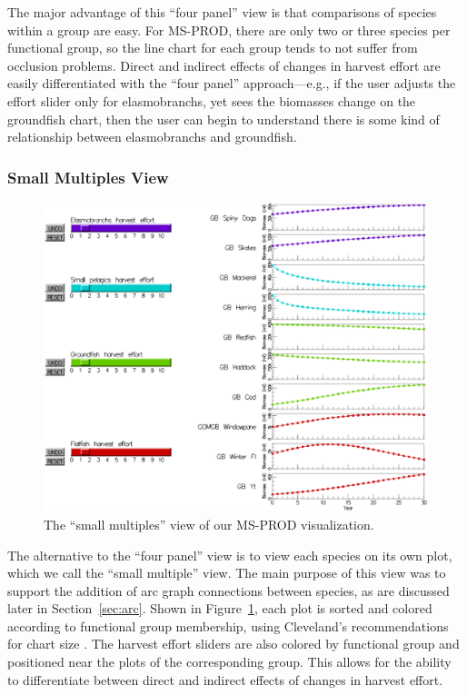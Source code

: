 The major advantage of this ``four panel'' view is that comparisons of species within a group are easy.  For MS-PROD, there are only two or three species per functional group, so the line chart for each group tends to not suffer from occlusion problems.  Direct and indirect effects of changes in harvest effort are easily differentiated with the ``four panel'' approach---e.g., if the user adjusts the effort slider only for elasmobranchs, yet sees the biomasses change on the groundfish chart, then the user can begin to understand there is some kind of relationship between elasmobranchs and groundfish.

\subsubsection{Small Multiples View}

\begin{figure}[h]
	\centering
	\includegraphics[width=12cm]{figures/eps/msprod_species.eps}
	\caption{The ``small multiples'' view of our MS-PROD visualization.}
	\label{fig:msprod_species}
\end{figure}

The alternative to the ``four panel'' view is to view each species on its own plot, which we call the ``small multiple'' view.  The main purpose of this view was to support the addition of arc graph connections between species, as are discussed later in Section~\ref{sec:arc}. Shown in Figure~\ref{fig:msprod_species}, each plot is sorted and colored according to functional group membership, using Cleveland's recommendations for chart size \cite{cleveland1988}.  The harvest effort sliders are also colored by functional group and positioned near the plots of the corresponding group.  This allows for the ability to differentiate between direct and indirect effects of changes in harvest effort.

